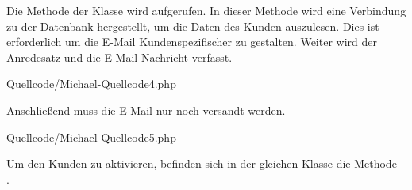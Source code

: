 Die Methode \grqq{} der Klasse \grqq{} wird aufgerufen. In dieser Methode wird eine Verbindung zu der Datenbank hergestellt, um die Daten des Kunden auszulesen.  Dies ist erforderlich um die E-Mail Kundenspezifischer zu gestalten.
Weiter wird der Anredesatz und die E-Mail-Nachricht verfasst.


\begin{center}
	\begin{lstinputlisting}[language=PHP, caption={Die E-Mail versenden}]
		{Quellcode/Michael-Quellcode4.php}
	\end{lstinputlisting}
\end{center}

\newpage
Anschließend muss die E-Mail nur noch versandt werden.


\begin{center}
	\begin{lstinputlisting}[language=PHP, caption={Anredesatz erstellen und E-Mail Nachricht verfassen}]
		{Quellcode/Michael-Quellcode5.php}
	\end{lstinputlisting}
\end{center}

Um den Kunden zu aktivieren, befinden sich in der gleichen Klasse die Methode \\
\grqq{}. 